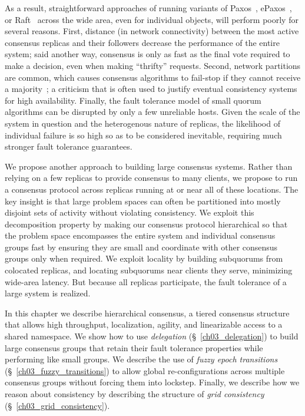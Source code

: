 As a result, straightforward approaches of running variants of Paxos~\cite{paxos,paxos_simple}, ePaxos~\cite{epaxos}, or Raft~\cite{raft} across the wide area, even for individual objects, will perform poorly for several reasons.
First, distance (in network connectivity) between the most active consensus replicas and their followers decrease the performance of the entire system; said another way, consensus is only as fast as the final vote required to make a decision, even when making ``thrifty'' requests.
Second, network partitions are common, which causes consensus algorithms to fail-stop if they cannot receive a majority~\cite{fail-stop}; a criticism that is often used to justify eventual consistency systems for high availability.
Finally, the fault tolerance model of small quorum algorithms can be disrupted by only a few unreliable hosts.
Given the scale of the system in question and the heterogenous nature of replicas, the likelihood of individual failure is so high so as to be considered inevitable, requiring much stronger fault tolerance guarantees.

We propose another approach to building large consensus systems.
Rather than relying on a few replicas to provide consensus to many clients, we propose to run a consensus protocol across replicas running at or near all of these locations.
The key insight is that large problem spaces can often be partitioned into mostly disjoint sets of activity without violating consistency.
We exploit this decomposition property by making our consensus protocol hierarchical so that the problem space encompasses the entire system and individual consensus groups fast by ensuring they are small and coordinate with other consensus groups only when required.
We exploit locality by building subquorums from colocated replicas, and locating subquorums near clients they serve, minimizing wide-area latency.
But because all replicas participate, the fault tolerance of a large system is realized.

In this chapter we describe hierarchical consensus, a tiered consensus structure that allows high throughput, localization, agility, and linearizable access to a shared namespace.
We show how to use \emph{delegation} (\S~\ref{ch03_delegation})  to build large consensus groups that retain their fault tolerance properties while performing like small groups.
We describe the use of \emph{fuzzy epoch transitions} (\S~\ref{ch03_fuzzy_transitions}) to allow global re-configurations across multiple consensus groups without forcing them into lockstep.
Finally, we describe how we reason about consistency by describing the structure of \emph{grid consistency} (\S~\ref{ch03_grid_consistency}).

